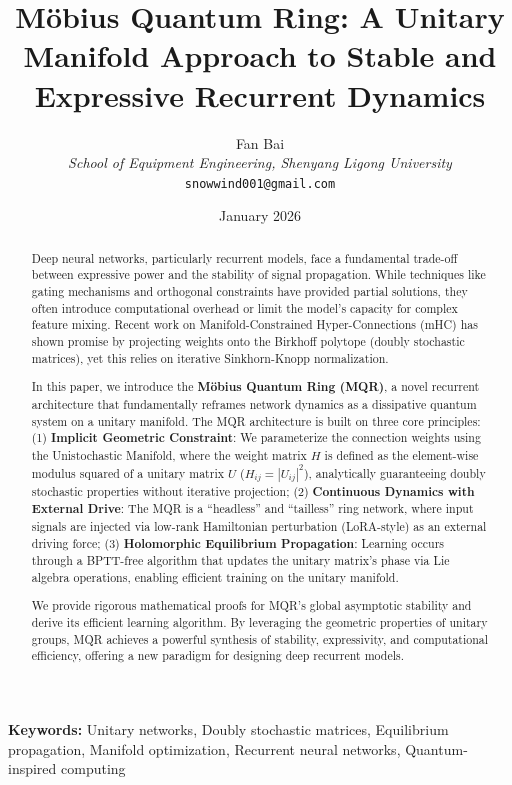 \documentclass[11pt,a4paper]{article}
\title{\textbf{Möbius Quantum Ring: A Unitary Manifold Approach to Stable and Expressive Recurrent Dynamics}}
\author{
  Fan Bai\\
  \textit{School of Equipment Engineering, Shenyang Ligong University}\\
  \texttt{snowwind001@gmail.com}
}
\date{January 2026}
\begin{document}
\maketitle

\begin{abstract}
Deep neural networks, particularly recurrent models, face a fundamental trade-off between expressive power and the stability of signal propagation. While techniques like gating mechanisms and orthogonal constraints have provided partial solutions, they often introduce computational overhead or limit the model's capacity for complex feature mixing. Recent work on Manifold-Constrained Hyper-Connections (mHC) has shown promise by projecting weights onto the Birkhoff polytope (doubly stochastic matrices), yet this relies on iterative Sinkhorn-Knopp normalization.

In this paper, we introduce the \textbf{Möbius Quantum Ring (MQR)}, a novel recurrent architecture that fundamentally reframes network dynamics as a dissipative quantum system on a unitary manifold. The MQR architecture is built on three core principles: (1) \textbf{Implicit Geometric Constraint}: We parameterize the connection weights using the Unistochastic Manifold, where the weight matrix $H$ is defined as the element-wise modulus squared of a unitary matrix $U$ ($H_{ij} = |U_{ij}|^2$), analytically guaranteeing doubly stochastic properties without iterative projection; (2) \textbf{Continuous Dynamics with External Drive}: The MQR is a ``headless'' and ``tailless'' ring network, where input signals are injected via low-rank Hamiltonian perturbation (LoRA-style) as an external driving force; (3) \textbf{Holomorphic Equilibrium Propagation}: Learning occurs through a BPTT-free algorithm that updates the unitary matrix's phase via Lie algebra operations, enabling efficient training on the unitary manifold.

We provide rigorous mathematical proofs for MQR's global asymptotic stability and derive its efficient learning algorithm. By leveraging the geometric properties of unitary groups, MQR achieves a powerful synthesis of stability, expressivity, and computational efficiency, offering a new paradigm for designing deep recurrent models.
\end{abstract}

\textbf{Keywords:} Unitary networks, Doubly stochastic matrices, Equilibrium propagation, Manifold optimization, Recurrent neural networks, Quantum-inspired computing
\end{document}
